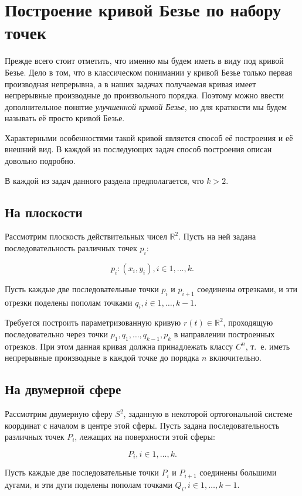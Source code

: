 \section{Построение кривой Безье по набору точек}

Прежде всего стоит отметить, что именно мы будем иметь в виду под кривой Безье. Дело в том, что в классическом
понимании у кривой Безье только первая производная непрерывна, а в наших задачах получаемая кривая имеет непрерывные
производные до произвольного порядка. Поэтому можно ввести дополнительное понятие \textit{улучшенной кривой Безье},
но для краткости мы будем называть её просто кривой Безье.

Характерными особенностями такой кривой является способ её построения и её внешний вид. В каждой из последующих задач
способ построения описан довольно подробно.

В каждой из задач данного раздела предполагается, что $k>2$.

\subsection*{На плоскости}

Рассмотрим плоскость действительных чисел $\mathbb{R}^2$. Пусть на ней задана последовательность различных точек $p_i$:

$${p_i: (x_i, y_i)}, i \in {1, \dots, k}.$$

Пусть каждые две последовательные точки $p_i$ и $p_{i+1}$ соединены отрезками, и эти отрезки поделены пополам точками
$q_i, i \in {1, \dots, k-1}$.

Требуется построить параметризованную кривую $r(t) \in \mathbb{R}^2$, проходящую последовательно через точки $p_1,
q_1, \dots, q_{k-1}, p_k$ в направлении построенных отрезков. При этом данная кривая должна принадлежать классу
$C^n$, т.~е. иметь непрерывные производные в каждой точке до порядка $n$ включительно.

\subsection*{На двумерной сфере}

Рассмотрим двумерную сферу $S^2$, заданную в некоторой ортогональной системе координат с началом в центре этой сферы.
Пусть задана последовательность различных точек $P_i$, лежащих на поверхности этой сферы:

$${P_i}, i \in {1, \dots, k}.$$

Пусть каждые две последовательные точки $P_i$ и $P_{i+1}$ соединены большими дугами, и эти дуги поделены пополам
точками $Q_i, i \in {1, \dots, k-1}$.

